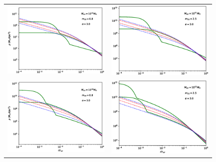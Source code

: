 \documentclass[a4paper,11pt]{article}
\begin{document}
\begin{figure}
\begin{tabular}{cc}
{\includegraphics[width = 3.1in, trim={2.1cm 0.5cm 0cm 0.5cm}]{pics/11_8_3.eps}} &
{\includegraphics[width = 3.1in, trim={2.1cm 0.5cm 0cm 0.5cm}]{pics/11_25_3.eps}}\\
{\includegraphics[width = 3.1in, trim={2.1cm 0.5cm 0cm 0.5cm}]{pics/12_8_3.eps}} &
{\includegraphics[width = 3.1in, trim={2.1cm 0.5cm 0cm 0.5cm}]{pics/12_25_3.eps}}

\end{tabular}
\end{figure}
\end{document}
